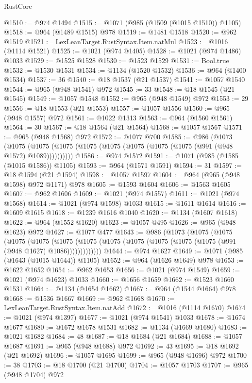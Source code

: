 \begin{lexlean}{RustCore}
\begin{coremodule}
@1510 := @974 @1494
@1515 := @1071 (@985 (@1509 (@1015 @1510)) @1105)
@1518 := @964 (@1489 @1515) @978
@1519 := @1481 @1518
@1520 := @962 @1519
@1521 := LexLeanTarget.RustSyntax.Item.natMul
@1523 := @1016 (@1114 @1521)
@1525 := @1021 (@974 @1405)
@1528 := @1021 (@974 @1486) @1033
@1529 := @1525 @1528
@1530 := @1523 @1529
@1531 := Bool.true
@1532 := @1530 @1531
@1534 := @1134 (@1520 @1532)
@1536 := @964 (@1400 @1534)
@1537 := 36
@1540 := @18 @1537 (@21 @1537)
@1541 := @1057 @1540
@1544 := @965 (@948 @1541) @972
@1545 := 33
@1548 := @18 @1545 (@21 @1545)
@1549 := @1057 @1548
@1552 := @965 (@948 @1549) @972
@1553 := 29
@1556 := @18 @1553 (@21 @1553)
@1557 := @1057 @1556
@1560 := @965 (@948 @1557) @972
@1561 := @1022 @1313
@1563 := @964 (@1560 @1561)
@1564 := 30
@1567 := @18 @1564 (@21 @1564)
@1568 := @1057 @1567
@1571 := @965 (@948 @1568) @972
@1572 := @1077 @700
@1585 := @986
    (@1073
      (@1075 (@1075 (@1075 (@1075 (@1075 (@1075 (@1075 (@1075 (@991 (@948 @1572) @1089))))))))))
@1586 := @974 @1572
@1591 := @1071 (@985 (@1585 (@1015 @1586)) @1105)
@1593 := @964 (@1571 @1591)
@1594 := 31
@1597 := @18 @1594 (@21 @1594)
@1598 := @1057 @1597
@1604 := @964 (@965 (@948 @1598) @972 @1171) @978
@1605 := @1593 @1604
@1606 := @1563 @1605
@1607 := @962 @1606
@1609 := @1021 (@974 @1557)
@1611 := @1021 (@974 @1568)
@1614 := @1021 (@974 @1598) @1033
@1615 := @1611 @1614
@1616 := @1609 @1615
@1618 := @1239 @1616 @1040
@1620 := @1134 (@1607 @1618)
@1622 := @964 (@1552 @1620)
@1623 := @1057 @495
@1626 := @965 (@948 @1623) @972
@1627 := @1077 @477
@1643 := @986
    (@1073
      (@1075
        (@1075
          (@1075
            (@1075
              (@1075 (@1075 (@1075 (@1075 (@1075 (@1075 (@1075 (@991 (@948 @1627) @1086)))))))))))))
@1644 := @974 @1627
@1649 := @1071 (@985 (@1643 (@1015 @1644)) @1105)
@1652 := @964 (@1626 @1649) @978
@1653 := @1622 @1652
@1654 := @962 @1653
@1656 := @1021 (@974 @1549)
@1659 := @1021 (@974 @1623) @1033
@1660 := @1656 @1659
@1662 := @1523 @1660 @1531
@1664 := @1134 (@1654 @1662)
@1667 := @964 (@1544 @1664) @978
@1668 := @1536 @1667
@1669 := @962 @1668
@1670 := LexLeanTarget.RustSyntax.Item.natAdd
@1672 := @1016 (@1114 @1670)
@1674 := @1021 (@974 @1397)
@1677 := @1021 (@974 @1541) @1033
@1678 := @1674 @1677
@1680 := @1672 @1678 @1531
@1682 := @1134 (@1669 @1680)
@1683 := @1021 @1682
@1684 := 48
@1687 := @18 @1684 (@21 @1684)
@1688 := @1057 @1687
@1691 := @965 (@948 @1688) @972
@1692 := 43
@1695 := @18 @1692 (@21 @1692)
@1696 := @1057 @1695
@1699 := @965 (@948 @1696) @972
@1700 := 38
@1703 := @18 @1700 (@21 @1700)
@1704 := @1057 @1703
@1707 := @965 (@948 @1704) @972

\end{coremodule}
\end{lexlean}
